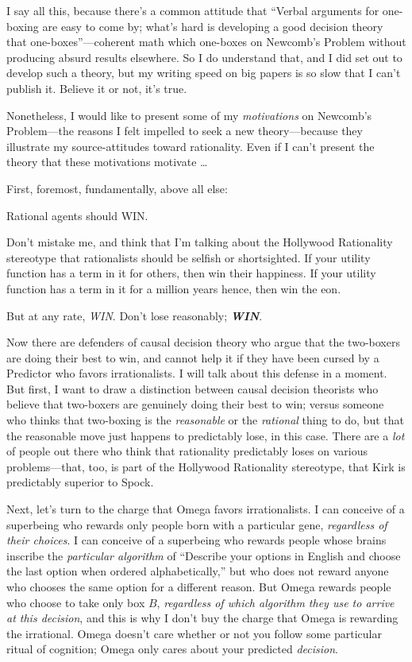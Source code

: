 {
 I say all this, because there's a common attitude
that ``Verbal arguments for one-boxing are easy to
come by; what's hard is developing a good decision
theory that one-boxes''---coherent math which
one-boxes on Newcomb's Problem without producing absurd
results elsewhere. So I do understand that, and I did set out to
develop such a theory, but my writing speed on big papers is so slow
that I can't publish it. Believe it or not,
it's true.}

{
 Nonetheless, I would like to present some of my
\textit{motivations} on Newcomb's Problem---the reasons
I felt impelled to seek a new theory---because they illustrate my
source-attitudes toward rationality. Even if I can't
present the theory that these motivations motivate \ldots}

{
 First, foremost, fundamentally, above all else:}

{
 Rational agents should WIN.}

{
 Don't mistake me, and think that
I'm talking about the Hollywood Rationality stereotype
that rationalists should be selfish or shortsighted. If your utility
function has a term in it for others, then win their happiness. If your
utility function has a term in it for a million years hence, then win
the eon.}

{
 But at any rate, \textit{WIN}. Don't lose
reasonably; \textbf{\textit{WIN}}.}

{
 Now there are defenders of causal decision theory who argue that
the two-boxers are doing their best to win, and cannot help it if they
have been cursed by a Predictor who favors irrationalists. I will talk
about this defense in a moment. But first, I want to draw a distinction
between causal decision theorists who believe that two-boxers are
genuinely doing their best to win; versus someone who thinks that
two-boxing is the \textit{reasonable} or the \textit{rational} thing to
do, but that the reasonable move just happens to predictably lose, in
this case. There are a \textit{lot} of people out there who think that
rationality predictably loses on various problems---that, too, is part
of the Hollywood Rationality stereotype, that Kirk is predictably
superior to Spock.}

{
 Next, let's turn to the charge that Omega favors
irrationalists. I can conceive of a superbeing who rewards only people
born with a particular gene, \textit{regardless of their choices}. I
can conceive of a superbeing who rewards people whose brains inscribe
the \textit{particular algorithm} of ``Describe your
options in English and choose the last option when ordered
alphabetically,'' but who does not reward anyone who
chooses the same option for a different reason. But Omega rewards
people who choose to take only box $B$, \textit{regardless of which
algorithm they use to arrive at this decision}, and this is why I
don't buy the charge that Omega is rewarding the
irrational. Omega doesn't care whether or not you
follow some particular ritual of cognition; Omega only cares about your
predicted \textit{decision}.}

